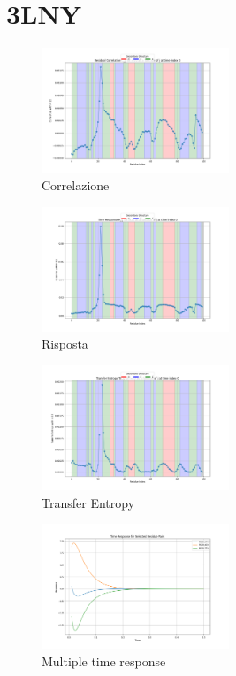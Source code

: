 \documentclass{article}
\begin{document}
\section{3LNY}
\begin{figure}[H]
    \centering
    \includegraphics[width=0.5\textwidth]{"images/3LNYResidual Correlation C_ij for i=22 as a function of j at time index 0.png"}
    \caption{Correlazione}
\end{figure}
\begin{figure}[H]
    \centering
    \includegraphics[width=0.5\textwidth]{"images/3LNYTime Response R_ij for i=22 as a function of j at time index 0.png"}
    \caption{Risposta}
\end{figure}

\begin{figure}[H]
    \centering
    \includegraphics[width=0.5\textwidth]{"images/3LNYTransfer Entropy TE_ij for i=22 as a function of j at time index 0.png"}
    \caption{Transfer Entropy}
\end{figure}


\begin{figure}[H]
    \centering
    \includegraphics[width=0.5\textwidth]{"images/3LNYMultiple_time_resposne.png"}
    \caption{Multiple time response}
\end{figure}
\end{document}
